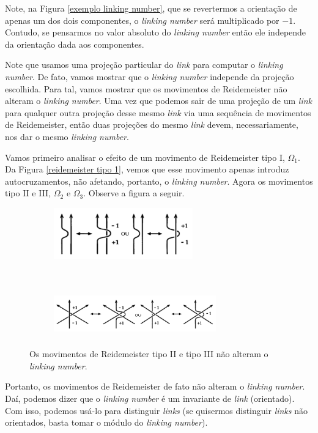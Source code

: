 \documentclass[a4paper,portuguese,11pt,twoside, leqno]{book}
\theoremstyle{definition}
\begin{document}
	\par\vspace{0.3cm} Note, na Figura \eqref{exemplo linking number}, que se revertermos a orientação de apenas um dos dois componentes, o \textit{linking number} será multiplicado por $-1$. Contudo, se pensarmos no valor absoluto do \textit{linking number} então ele independe da orientação dada aos componentes.
	\par\vspace{0.3cm} Note que usamos uma projeção particular do \textit{link} para computar o \textit{linking number}. De fato, vamos mostrar que o \textit{linking number} independe da projeção escolhida. Para tal, vamos mostrar que os movimentos de Reidemeister não alteram o \textit{linking number}. Uma vez que podemos sair de uma projeção de um \textit{link} para qualquer outra projeção desse mesmo \textit{link} via uma sequência de movimentos de Reidemeister, então duas projeções do mesmo \textit{link} devem, necessariamente, nos dar o mesmo \textit{linking number}.
	\par\vspace{0.3cm} Vamos primeiro analisar o efeito de um movimento de Reidemeister tipo I, $\Omega_1$. Da Figura \eqref{reidemeister tipo 1}, vemos que esse movimento apenas introduz autocruzamentos, não afetando, portanto, o \textit{linking number}. Agora os movimentos tipo II e III, $\Omega_2$ e $\Omega_3$. Observe a figura a seguir.
	\begin{figure}[H]
		\centering
		\begin{subfigure}[t]{0.5\textwidth}
			\centering
			\includegraphics[width=6cm]{Images/reidemeister2linkingnumber.png}
			\caption{}
			\label{omega2}
		\end{subfigure}%
		~ 
		\begin{subfigure}[t]{0.5\textwidth}
			\centering
			\includegraphics[width=7cm, height=2cm]{Images/reidemeister3linkingnumber.png}
			\caption{}
			\label{omega3}
		\end{subfigure}
		\caption{Os movimentos de Reidemeister tipo II e tipo III não alteram o \textit{linking number}.}
	\end{figure}
	\par\vspace{0.3cm} Portanto, os movimentos de Reidemeister de fato não alteram o \textit{linking number}. Daí, podemos dizer que o \textit{linking number} é um invariante de \textit{link} (orientado). Com isso, podemos usá-lo para distinguir \textit{links} (se quisermos distinguir \textit{links} não orientados, basta tomar o módulo do \textit{linking number}).
	
\end{document}
